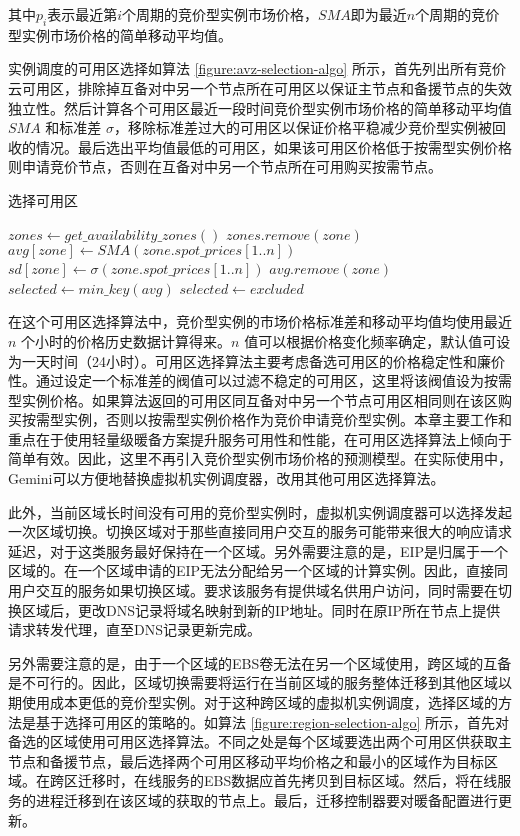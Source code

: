 其中$p_i$表示最近第$i$个周期的竞价型实例市场价格，$SMA$即为最近$n$个周期的竞价型实例市场价格的简单移动平均值。

实例调度的可用区选择如算法 \ref{figure:avz-selection-algo} 所示，首先列出所有竞价云可用区，排除掉互备对中另一个节点所在可用区以保证主节点和备援节点的失效独立性。然后计算各个可用区最近一段时间竞价型实例市场价格的简单移动平均值 $SMA$ 和标准差 $\sigma$，移除标准差过大的可用区以保证价格平稳减少竞价型实例被回收的情况。最后选出平均值最低的可用区，如果该可用区价格低于按需型实例价格则申请竞价节点，否则在互备对中另一个节点所在可用购买按需节点。

\begin{algorithm}
\caption{选择可用区}
\label{figure:avz-selection-algo}
$zones\gets get\_availability\_zones()$\;
{
  {
    $zones.remove(zone)$\;
  }
}
{
  $avg[zone]\gets SMA(zone.spot\_prices[1..n])$\;
  $sd[zone]\gets \sigma(zone.spot\_prices[1..n])$\;
}
{
  {
    $avg.remove(zone)$\;
  }
}
$selected\gets min\_key(avg)$\;
{
  $selected\gets excluded$\;
}
\end{algorithm}

在这个可用区选择算法中，竞价型实例的市场价格标准差和移动平均值均使用最近 $n$ 个小时的价格历史数据计算得来。$n$ 值可以根据价格变化频率确定，默认值可设为一天时间（24小时）。可用区选择算法主要考虑备选可用区的价格稳定性和廉价性。通过设定一个标准差的阀值可以过滤不稳定的可用区，这里将该阀值设为按需型实例价格。如果算法返回的可用区同互备对中另一个节点可用区相同则在该区购买按需型实例，否则以按需型实例价格作为竞价申请竞价型实例。本章主要工作和重点在于使用轻量级暖备方案提升服务可用性和性能，在可用区选择算法上倾向于简单有效。因此，这里不再引入竞价型实例市场价格的预测模型。在实际使用中，Gemini可以方便地替换虚拟机实例调度器，改用其他可用区选择算法。

此外，当前区域长时间没有可用的竞价型实例时，虚拟机实例调度器可以选择发起一次区域切换。切换区域对于那些直接同用户交互的服务可能带来很大的响应请求延迟，对于这类服务最好保持在一个区域。另外需要注意的是，EIP是归属于一个区域的。在一个区域申请的EIP无法分配给另一个区域的计算实例。因此，直接同用户交互的服务如果切换区域。要求该服务有提供域名供用户访问，同时需要在切换区域后，更改DNS记录将域名映射到新的IP地址。同时在原IP所在节点上提供请求转发代理，直至DNS记录更新完成。

另外需要注意的是，由于一个区域的EBS卷无法在另一个区域使用，跨区域的互备是不可行的。因此，区域切换需要将运行在当前区域的服务整体迁移到其他区域以期使用成本更低的竞价型实例。对于这种跨区域的虚拟机实例调度，选择区域的方法是基于选择可用区的策略的。如算法 \ref{figure:region-selection-algo} 所示，首先对备选的区域使用可用区选择算法。不同之处是每个区域要选出两个可用区供获取主节点和备援节点，最后选择两个可用区移动平均价格之和最小的区域作为目标区域。在跨区迁移时，在线服务的EBS数据应首先拷贝到目标区域。然后，将在线服务的进程迁移到在该区域的获取的节点上。最后，迁移控制器要对暖备配置进行更新。%

